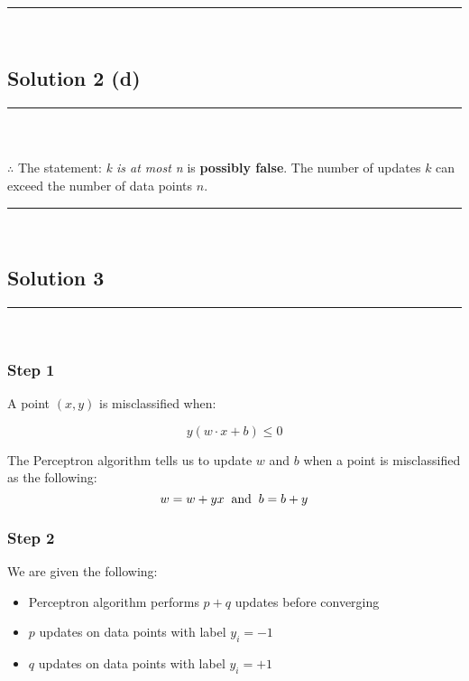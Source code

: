 \documentclass{article}
\begin{document}
\noindent\rule{\textwidth}{0.4pt}\\

\subsection*{Solution 2 (d)}
\noindent\rule{\textwidth}{0.4pt}\\

\subsubsection*{\normalfont}{$\therefore$ The statement: \textit{k is at most n} is \textbf{possibly false}. The number of updates $k$ can exceed the number of data points $n$.}

\noindent\rule{\textwidth}{0.4pt}\\

\newpage

\subsection*{Solution 3}
\noindent\rule{\textwidth}{0.4pt}\\

\subsubsection*{Step 1}
\parbox{\textwidth}{
A point $(x, y)$ is misclassified when:

$$y(w \cdot x + b) \leq 0 $$

The Perceptron algorithm tells us to update $w$ and $b$ when a point is misclassified as the following:
$$ w= w +yx \hspace{0.2cm} \text{and} \hspace{0.2cm} b = b + y$$

}

\subsubsection*{Step 2}
\parbox{\textwidth}{
We are given the following: 
\begin{itemize}
    \item Perceptron algorithm performs $p+q$ updates before converging
    \item $p$ updates on data points with label $y_i = -1$
    \item $q$ updates on data points with label $y_i = +1$
\end{itemize}

}
\end{document}
